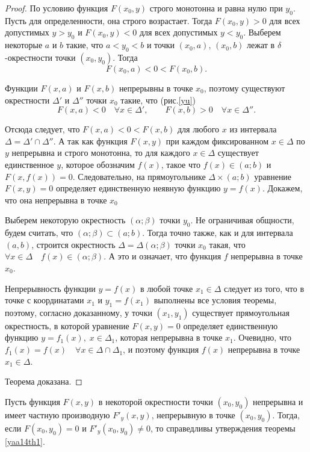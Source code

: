 \begin{proof}

\leavevmode{}\label{yu}
По условию функция $F(x_0,y)$ строго монотонна и равна нулю при  $y_0$.  Пусть для определенности, она строго возрастает. Тогда $F(x_0,y)>0$ для всех допустимых $y>y_0$ и $F(x_0,y)<0$ для всех допустимых $y<y_0$.
Выберем некоторые $a$ и $b$ такие, что $a<y_0<b$ и точки $(x_0,a)$, $(x_0,b)$ лежат в $\delta$-окрестности точки $(x_0,y_0)$. Тогда
$$
F(x_0,a)<0<F(x_0,b).
$$



Функции $F(x,a)$ и $F(x,b)$ непрерывны в точке $x_0$, поэтому существуют окрестности $\Delta'$ и $\Delta''$ точки $x_0$ такие, что (рис.\ref{yu})
$$
F(x,a)<0 \quad \forall x\in \Delta', \qquad F(x,b)>0\quad \forall x\in \Delta''.
$$



Отсюда следует, что $F(x,a)<0<F(x,b)$ для любого $x$ из интервала $\Delta = \Delta'\cap\Delta''$. А так как функция $F(x,y)$ при каждом фиксированном $x\in\Delta$ по $y$ непрерывна и строго монотонна, то для каждого $x\in \Delta$ существует единственное $y$, которое обозначим $f(x)$, такое что $f(x)\in(a;b)$ и $F(x,f(x))=0$. Следовательно, на прямоугольнике $\Delta\times(a;b)$ уравнение $F(x,y)=0$ определяет единственную неявную функцию $y=f(x)$. Докажем, что она непрерывна в точке $x_0$

Выберем некоторую окрестность $(\alpha;\beta)$ точки $y_0$. Не ограничивая общности, будем считать, что $(\alpha;\beta)\subset (a;b)$. Тогда точно также, как и для интервала $(a,b)$, строится окрестность $\Delta=\Delta(\alpha;\beta)$ точки $x_0$ такая, что $\forall x\in\Delta \quad f(x)\in(\alpha;\beta)$. А это и означает, что функция $f$ непрерывна в точке $x_0$.

Непрерывность функции $y=f(x)$ в любой точке $x_1\in\Delta$ следует из того, что в точке с координатами $x_1$ и $y_1=f(x_1)$ выполнены все условия теоремы, поэтому, согласно доказанному, у точки $(x_1,y_1)$ существует прямоугольная окрестность, в которой уравнение $F(x,y)=0$ определяет единственную функцию $y=f_1(x),\;x\in\Delta_1$, которая непрерывна в точке $x_1$. Очевидно, что $f_1(x)=f(x)\quad \forall x\in\Delta\cap\Delta_1$, и поэтому функция $f(x)$ непрерывна в точке $x_1\in\Delta$.

Теорема доказана.
\end{proof}

\begin{cons}
Пусть функция $F(x,y)$ в некоторой окрестности точки $(x_0,y_0)$ непрерывна и имеет частную производную $F'_y(x,y)$, непрерывную в точке $(x_0,y_0)$. Тогда, если $F(x_0,y_0)=0$ и $F'_y(x_0,y_0)\ne 0 $, то справедливы утверждения теоремы \ref{yaa14th1}.
\end{cons}

